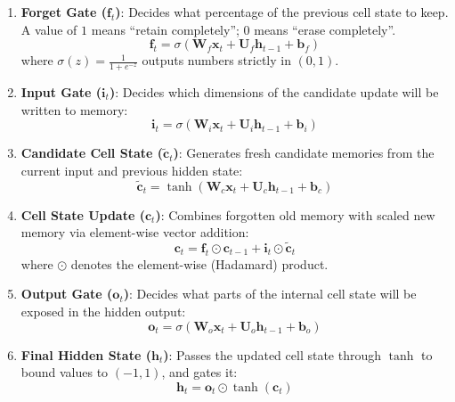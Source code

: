 \begin{enumerate}
    \item \textbf{Forget Gate ($\mathbf{f}_t$)}: Decides what percentage of the previous cell state to keep. A value of $1$ means ``retain completely''; $0$ means ``erase completely''.
    \begin{equation}
    \mathbf{f}_t = \sigma(\mathbf{W}_f \mathbf{x}_t + \mathbf{U}_f \mathbf{h}_{t-1} + \mathbf{b}_f)\label{eq:lstm_forget}
    \end{equation}
    where $\sigma(z) = \frac{1}{1 + e^{-z}}$ outputs numbers strictly in $(0, 1)$.

    \item \textbf{Input Gate ($\mathbf{i}_t$)}: Decides which dimensions of the candidate update will be written to memory:
    \begin{equation}
    \mathbf{i}_t = \sigma(\mathbf{W}_i \mathbf{x}_t + \mathbf{U}_i \mathbf{h}_{t-1} + \mathbf{b}_i)\label{eq:lstm_input}
    \end{equation}

    \item \textbf{Candidate Cell State ($\tilde{\mathbf{c}}_t$)}: Generates fresh candidate memories from the current input and previous hidden state:
    \begin{equation}
    \tilde{\mathbf{c}}_t = \tanh(\mathbf{W}_c \mathbf{x}_t + \mathbf{U}_c \mathbf{h}_{t-1} + \mathbf{b}_c)\label{eq:lstm_cand}
    \end{equation}

    \item \textbf{Cell State Update ($\mathbf{c}_t$)}: Combines forgotten old memory with scaled new memory via element-wise vector addition:
    \begin{equation}
    \mathbf{c}_t = \mathbf{f}_t \odot \mathbf{c}_{t-1} + \mathbf{i}_t \odot \tilde{\mathbf{c}}_t\label{eq:lstm_cell_update}
    \end{equation}
    where $\odot$ denotes the element-wise (Hadamard) product.

    \item \textbf{Output Gate ($\mathbf{o}_t$)}: Decides what parts of the internal cell state will be exposed in the hidden output:
    \begin{equation}
    \mathbf{o}_t = \sigma(\mathbf{W}_o \mathbf{x}_t + \mathbf{U}_o \mathbf{h}_{t-1} + \mathbf{b}_o)\label{eq:lstm_output_gate}
    \end{equation}

    \item \textbf{Final Hidden State ($\mathbf{h}_t$)}: Passes the updated cell state through $\tanh$ to bound values to $(-1, 1)$, and gates it:
    \begin{equation}
    \mathbf{h}_t = \mathbf{o}_t \odot \tanh(\mathbf{c}_t)\label{eq:lstm_hidden_update}
    \end{equation}
\end{enumerate}

